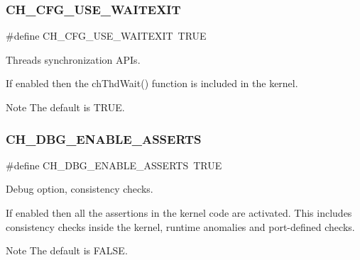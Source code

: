 \subsubsection{\texorpdfstring{C\+H\+\_\+\+C\+F\+G\+\_\+\+U\+S\+E\+\_\+\+W\+A\+I\+T\+E\+X\+IT}{CH\_CFG\_USE\_WAITEXIT}}
{\footnotesize\ttfamily \#define C\+H\+\_\+\+C\+F\+G\+\_\+\+U\+S\+E\+\_\+\+W\+A\+I\+T\+E\+X\+IT~T\+R\+UE}



Threads synchronization A\+P\+Is. 

If enabled then the {\ttfamily ch\+Thd\+Wait()} function is included in the kernel.

\begin{DoxyNote}{Note}
The default is {\ttfamily T\+R\+UE}. 
\end{DoxyNote}
\hypertarget{group__config_gad602fd2546073869a10859158d865b9b}{}\label{group__config_gad602fd2546073869a10859158d865b9b} 
\subsubsection{\texorpdfstring{C\+H\+\_\+\+D\+B\+G\+\_\+\+E\+N\+A\+B\+L\+E\+\_\+\+A\+S\+S\+E\+R\+TS}{CH\_DBG\_ENABLE\_ASSERTS}}
{\footnotesize\ttfamily \#define C\+H\+\_\+\+D\+B\+G\+\_\+\+E\+N\+A\+B\+L\+E\+\_\+\+A\+S\+S\+E\+R\+TS~T\+R\+UE}



Debug option, consistency checks. 

If enabled then all the assertions in the kernel code are activated. This includes consistency checks inside the kernel, runtime anomalies and port-\/defined checks.

\begin{DoxyNote}{Note}
The default is {\ttfamily F\+A\+L\+SE}. 
\end{DoxyNote}
\hypertarget{group__config_gaef984ca3bfd8a71478ad55ce6e56a8bb}{}\label{group__config_gaef984ca3bfd8a71478ad55ce6e56a8bb} 

